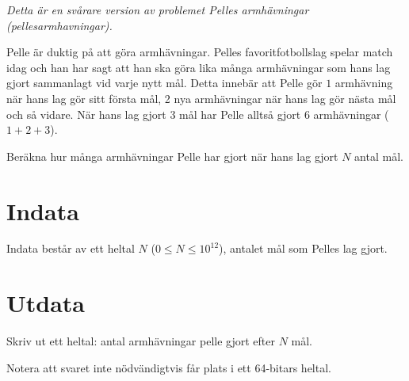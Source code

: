 
\emph{Detta är en svårare version av problemet Pelles armhävningar (pellesarmhavningar).}

Pelle är duktig på att göra armhävningar. Pelles favoritfotbollslag spelar match idag och
han har sagt att han ska göra lika många armhävningar som hans lag gjort sammanlagt vid
varje nytt mål. Detta innebär att Pelle gör $1$ armhävning när hans lag gör sitt första mål,
2 nya armhävningar när hans lag gör nästa mål och så vidare. När hans lag gjort $3$ mål har
Pelle alltså gjort $6$ armhävningar ($1+2+3$).

Beräkna hur många armhävningar Pelle har gjort när hans lag gjort $N$ antal mål.

\section*{Indata}
Indata består av ett heltal $N$ ($0 \leq N \leq 10^{12}$), antalet mål som Pelles lag gjort.

\section*{Utdata}
Skriv ut ett heltal: antal armhävningar pelle gjort efter $N$ mål.

Notera att svaret inte nödvändigtvis får plats i ett 64-bitars heltal.
